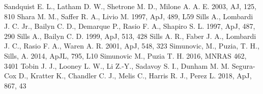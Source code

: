 \documentclass{aastex62}
\begin{document}
\begin{thebibliography}{}
 Sandquist E. L., Latham D. W., Shetrone M. D., Milone A. A. E. 2003, AJ, 125, 810
 Shara M. M., Saffer R. A., Livio M. 1997,
  ApJ, 489, L59
 Sills A., Lombardi J. C. Jr.,
Bailyn C. D., Demarque P., Rasio F. A., Shapiro S. L. 1997, ApJ, 487, 290
 Sills A., Bailyn C. D. 1999,
  ApJ, 513, 428
 Sills A. R., Faber J. A.,
  Lombardi J. C., Rasio F. A., Waren A. R. 2001, ApJ, 548, 323
 Simunovic, M., Puzia, T. H., Sills, A. 2014, ApJL, 795, L10
 Simunovic M., Puzia T. H. 2016, MNRAS 462, 3401
 Tobin J. J., Looney L. W., Li Z.-Y., Sadavoy S. I., Dunham M. M. Segura-Cox D., Kratter K., Chandler C. J., Melis C., Harris R. J., Perez L. 2018, ApJ, 867, 43 

\end{thebibliography}
\end{document}
